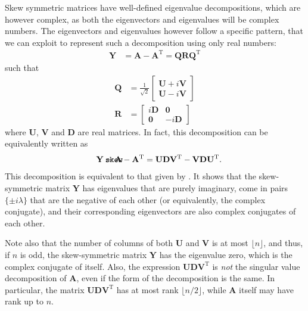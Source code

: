 \documentclass{article}
\def\mathnote#1{%
  \tag*{\rlap{\hspace\marginparsep\smash{\parbox[t]{\marginparwidth}{#1}}}}
}
\begin{document}
Skew symmetric matrices have well-defined eigenvalue decompositions,
which are however complex, as both the eigenvectors and eigenvalues will
be complex numbers.  The eigenvectors and eigenvalues however follow a
specific pattern, that we can exploit to represent such a decomposition
using only real numbers:
\begin{align}
  \mathbf Y &= \mathbf A - \mathbf A^{\mathrm T} = \mathbf Q \mathbf R \mathbf Q^{\mathrm T}
\end{align}
such that
\begin{align}
  \mathbf Q &= \frac 1 {\sqrt{2}} \left[
    \begin{array}{cc}
      \mathbf U + i \mathbf V \\
      \mathbf U - i \mathbf V 
    \end{array}
    \right] \\
  \mathbf R &= \left[ \begin{array}{cc}
      i \mathbf D & \mathbf 0 \\
      \mathbf 0 & -i \mathbf D
    \end{array} \right]
\end{align}
where $\mathbf U$, $\mathbf V$ and $\mathbf D$ are real matrices.  In
fact, this decomposition can be equivalently written as
\begin{align}
  \mathnote{\texttt{skew}}
  \mathbf Y = \mathbf A - \mathbf A^{\mathrm T} &=
  \mathbf U \mathbf D \mathbf V^{\mathrm T} - \mathbf V \mathbf D \mathbf U^{\mathrm T}.
\end{align}
This decomposition is equivalent to that given by 
\cite{b869}.  It shows that the skew-symmetric matrix $\mathbf Y$ has
eigenvalues that are purely imaginary, come  
in pairs $\{\pm i \lambda\}$ that are the negative of each other (or
equivalently, the complex conjugate), and their corresponding
eigenvectors are also complex conjugates of each other.

Note also that the number of columns of both $\mathbf U$ and $\mathbf V$
is at most $\lfloor n \rfloor$, and thus, if $n$ is odd, the
skew-symmetric matrix $\mathbf Y$ has the
eigenvalue zero, which is the complex conjugate of itself.  Also, the
expression $\mathbf U \mathbf D \mathbf V^{\mathrm T}$ is \emph{not} the
singular value decomposition of $\mathbf A$, even if the form of the
decomposition is the same.  
In particular, the matrix $\mathbf U \mathbf
D \mathbf V^{\mathrm T}$ has at most rank $\lfloor n/2 \rfloor$, while
$\mathbf A$ itself may have rank up to $n$. 
\end{document}
